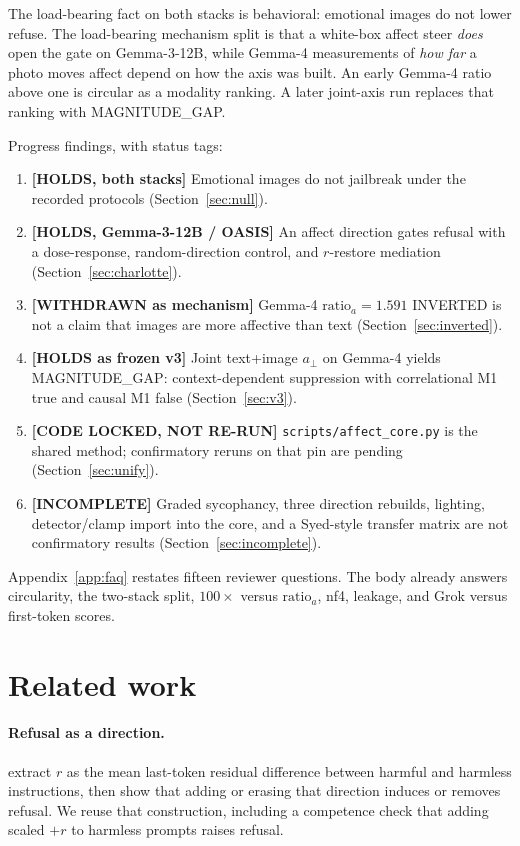 \documentclass{article}
\begin{document}
The load-bearing fact on both stacks is behavioral: emotional images do not lower refuse. The load-bearing mechanism split is that a white-box affect steer \emph{does} open the gate on Gemma-3-12B, while Gemma-4 measurements of \emph{how far} a photo moves affect depend on how the axis was built. An early Gemma-4 ratio above one is circular as a modality ranking. A later joint-axis run replaces that ranking with MAGNITUDE\_GAP.

Progress findings, with status tags:

\begin{enumerate}
\item \textbf{[HOLDS, both stacks]} Emotional images do not jailbreak under the recorded protocols (Section~\ref{sec:null}).
\item \textbf{[HOLDS, Gemma-3-12B / OASIS]} An affect direction gates refusal with a dose-response, random-direction control, and $r$-restore mediation (Section~\ref{sec:charlotte}).
\item \textbf{[WITHDRAWN as mechanism]} Gemma-4 $\mathrm{ratio}_a=1.591$ INVERTED is not a claim that images are more affective than text (Section~\ref{sec:inverted}).
\item \textbf{[HOLDS as frozen v3]} Joint text+image $a_\perp$ on Gemma-4 yields MAGNITUDE\_GAP: context-dependent suppression with correlational M1 true and causal M1 false (Section~\ref{sec:v3}).
\item \textbf{[CODE LOCKED, NOT RE-RUN]} \texttt{scripts/affect\_core.py} is the shared method; confirmatory reruns on that pin are pending (Section~\ref{sec:unify}).
\item \textbf{[INCOMPLETE]} Graded sycophancy, three direction rebuilds, lighting, detector/clamp import into the core, and a Syed-style transfer matrix are not confirmatory results (Section~\ref{sec:incomplete}).
\end{enumerate}

Appendix~\ref{app:faq} restates fifteen reviewer questions. The body already answers circularity, the two-stack split, $100\times$ versus $\mathrm{ratio}_a$, nf4, leakage, and Grok versus first-token scores.

\section{Related work}
\label{sec:related}

\paragraph{Refusal as a direction.}
\citet{arditi2024refusal} extract $r$ as the mean last-token residual difference between harmful and harmless instructions, then show that adding or erasing that direction induces or removes refusal. We reuse that construction, including a competence check that adding scaled $+r$ to harmless prompts raises refusal.
\end{document}
